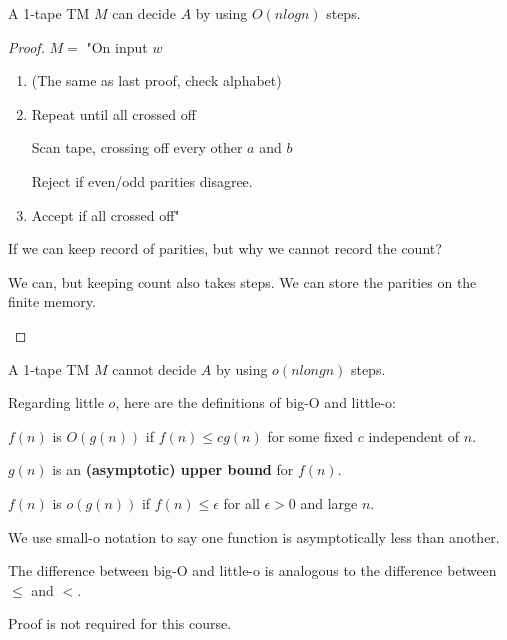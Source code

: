 \begin{theorem}
    A 1-tape TM \(M\) can decide \(A\) by using \(O(n log n)\) steps.
\end{theorem}
\begin{proof}
    \(M = \)  "On input \(w\)
    \begin{enumerate}
        \item (The same as last proof, check alphabet) 
        \item Repeat until all crossed off
        
        Scan tape, crossing off every other \(a\) and \(b\) 
        
        Reject if even/odd parities disagree.
        \item Accept if all crossed off"
    \end{enumerate} 


    \begin{note}
        If we can keep record of parities, but why we cannot record the count?

        We can, but keeping count also takes steps. We can store the parities on the finite memory.
    \end{note}
\end{proof}
\begin{theorem}
    A 1-tape TM \(M\) cannot decide \(A\) by using \(o(n long n)\) steps.   

    Regarding little \(o\), here are the definitions of big-O and little-o: 
    \begin{definition}[Big-O]
        \(f(n)\) is \(O(g(n))\) if \(f(n) \leq cg(n)\) for some fixed \(c\) independent of \(n\).     

        \(g(n)\) is an \textbf{(asymptotic) upper bound} for \(f(n)\).    
    \end{definition}
    \begin{definition}[Little-o]
       \(f(n)\) is \(o(g(n))\) if \(f(n) \leq \epsilon\) for all \(\epsilon > 0\) and large \(n\).     

       \begin{remark}
            We use small-o notation to say one function is asymptotically less than another.

            The difference between big-O and little-o is analogous to the difference between \(\leq\) and \(<\).  
       \end{remark}
    \end{definition}
\end{theorem}
Proof is not required for this course.

